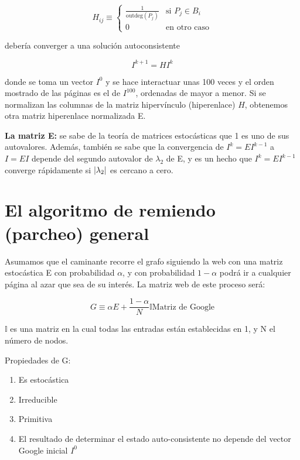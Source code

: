 \[
H_{ij} \equiv \begin{cases}
\frac{1}{\mathrm{outdeg}(P_j)} & \text{si } P_j \in B_i \\
0 & \text{en otro caso}
\end{cases}
\]

debería converger a una solución autoconsistente

\[
I^{k+1} = H I^k
\]

donde se toma un vector $I^{0}$ y se hace interactuar unas 100 veces y el orden mostrado de las páginas es el de $I^{100}$, ordenadas de mayor a menor. Si se normalizan las columnas de la matriz hipervínculo (hiperenlace) $H$, obtenemos otra matriz hiperenlace normalizada E.

\textbf{La matriz E:} se sabe de la teoría de matrices estocásticas que 1 es uno de sus autovalores. Además, también se sabe que la convergencia de $I^k = E I^{k-1}$ a $I = E I$ depende del segundo autovalor de $\lambda_2$ de E, y es un hecho que $I^k = E I^{k-1}$ converge rápidamente si $\abs{\lambda_2}$ es
cercano a cero.

\section{El algoritmo de remiendo (parcheo) general}

Asumamos que el caminante recorre el grafo siguiendo la web con una matriz estocástica E con probabilidad $\alpha$, y con probabilidad $1-\alpha$ podrá ir a cualquier página al azar que sea de su interés. La matriz web de este proceso será:

\[
G \equiv \alpha E + \frac{1-\alpha}{N} \mathds{I} \text{Matriz de Google}
\]

$\mathds{I}$ es una matriz en la cual todas las entradas están establecidas en 1, y N el número de nodos.

Propiedades de G:
\begin{enumerate}
\item Es estocástica
\item Irreducible
\item Primitiva
\item El resultado de determinar el estado auto-consistente no depende del vector Google inicial $I^0$
\end{enumerate}

